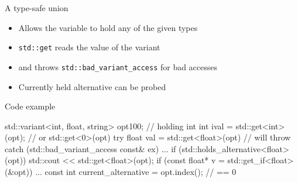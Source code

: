 \begin{frame}[fragile]
  \begin{block}{A type-safe union}
    \begin{itemize}
    \item Allows the variable to hold any of the given types
    \item \texttt{std::get} reads the value of the variant
    \item and throws \texttt{std::bad_variant_access} for bad accesses
    \item Currently held alternative can be probed
    \end{itemize}
  \end{block}
  \begin{exampleblock}{Code example}
    \small
    \begin{cppcode*}{}
      std::variant<int, float, string> opt{100}; // holding int
      int ival = std::get<int>(opt); // or std::get<0>(opt)
      try {
        float val = std::get<float>(opt) // will throw
      } catch (std::bad_variant_access const& ex) {...}
      if (std::holds_alternative<float>(opt))
          std::cout << std::get<float>(opt);
      if (const float* v = std::get_if<float>(&opt)) { ... }
      const int current_alternative = opt.index(); // == 0
    \end{cppcode*}
  \end{exampleblock}

\end{frame}


